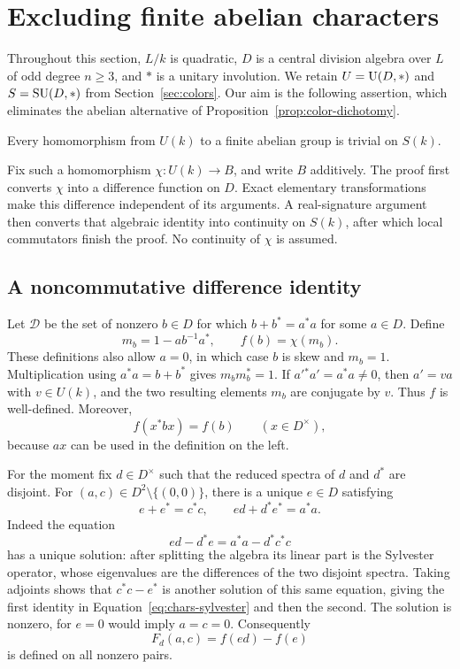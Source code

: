 \section{Excluding finite abelian characters}\label{sec:characters}

Throughout this section, $L/k$ is quadratic, $D$ is a central division
algebra over $L$ of odd degree $n\geq3$, and $*$ is a unitary involution.
We retain $U=\operatorname{U}(D,*)$ and $S=\operatorname{SU}(D,*)$ from
Section~\ref{sec:colors}. Our aim is the following assertion, which
eliminates the abelian alternative of
Proposition~\ref{prop:color-dichotomy}.

\begin{theorem}\label{thm:no-characters}
Every homomorphism from $U(k)$ to a finite abelian group is trivial on
$S(k)$.
\end{theorem}

Fix such a homomorphism $\chi:U(k)\to B$, and write $B$ additively.
The proof first converts $\chi$ into a difference function on $D$.
Exact elementary transformations make this difference independent of its
arguments. A real-signature argument then converts that algebraic
identity into continuity on $S(k)$, after which local commutators finish
the proof. No continuity of $\chi$ is assumed.

\subsection{A noncommutative difference identity}

Let $\mathcal D$ be the set of nonzero $b\in D$ for which
$b+b^*=a^*a$ for some $a\in D$. Define
\begin{equation}\label{eq:chars-f}
 m_b=1-ab^{-1}a^*,\qquad f(b)=\chi(m_b).
\end{equation}
These definitions also allow $a=0$, in which case $b$ is skew and
$m_b=1$. Multiplication using $a^*a=b+b^*$ gives
$m_bm_b^*=1$. If $a'{}^*a'=a^*a\ne0$, then $a'=va$ with
$v\in U(k)$, and the two resulting elements $m_b$ are conjugate by
$v$. Thus $f$ is well-defined. Moreover,
\begin{equation}\label{eq:chars-congruence}
 f(x^*bx)=f(b)\qquad(x\in D^\times),
\end{equation}
because $ax$ can be used in the definition on the left.

For the moment fix $d\in D^\times$ such that the reduced spectra of
$d$ and $d^*$ are disjoint. For $(a,c)\in D^2\setminus\{(0,0)\}$,
there is a unique $e\in D$ satisfying
\begin{equation}\label{eq:chars-sylvester}
 e+e^*=c^*c,\qquad ed+d^*e^*=a^*a.
\end{equation}
Indeed the equation
\[
 ed-d^*e=a^*a-d^*c^*c
\]
has a unique solution: after splitting the algebra its linear part is
the Sylvester operator, whose eigenvalues are the differences of the
two disjoint spectra. Taking adjoints shows that $c^*c-e^*$ is another
solution of this same equation, giving the first identity in
Equation~\ref{eq:chars-sylvester} and then the second. The solution is
nonzero, for $e=0$ would imply $a=c=0$. Consequently
\[
 F_d(a,c)=f(ed)-f(e)
\]
is defined on all nonzero pairs.

